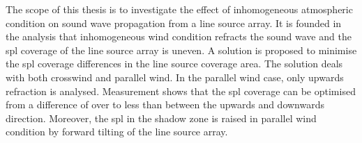 {The scope of this thesis is to investigate the effect of inhomogeneous atmospheric condition on sound wave propagation from a line source array. It is founded in the analysis that inhomogeneous wind condition refracts the sound wave and the \gls{spl} coverage of the line source array is uneven. A solution is proposed to minimise the  \gls{spl} coverage differences in the line source coverage area. The solution deals with both crosswind and parallel wind. In the parallel wind case, only upwards refraction is analysed. Measurement shows that the \gls{spl} coverage can be optimised from a difference of over  to less than  between the upwards and downwards direction. Moreover, the \gls{spl} in the shadow zone is raised in parallel wind condition by forward tilting of the line source array.  

}

\newcommand{\projectSynopsis}{
Synopsis
}